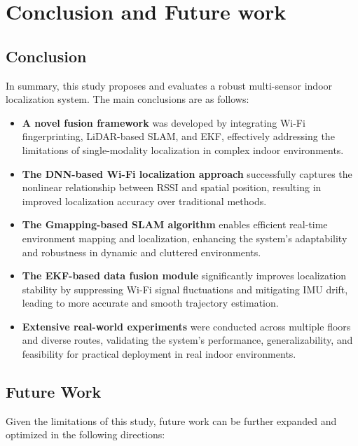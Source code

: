 \documentclass[12pt,a4paper]{article}
\numberwithin{equation}{section}
\begin{document}
\newpage
\section{Conclusion and Future work}
\subsection{Conclusion}
In summary, this study proposes and evaluates a robust multi-sensor indoor
localization system. The main conclusions are as follows:

\begin{itemize}
\item \textbf{A novel fusion framework} was developed by integrating Wi-Fi
  fingerprinting, LiDAR-based SLAM, and EKF, effectively addressing the
  limitations of single-modality localization in complex indoor environments.
  
\item \textbf{The DNN-based Wi-Fi localization approach} successfully captures
  the nonlinear relationship between RSSI and spatial position, resulting in
  improved localization accuracy over traditional methods.
  
\item \textbf{The Gmapping-based SLAM algorithm} enables efficient real-time
  environment mapping and localization, enhancing the system's adaptability and
  robustness in dynamic and cluttered environments.
  
\item \textbf{The EKF-based data fusion module} significantly improves
  localization stability by suppressing Wi-Fi signal fluctuations and mitigating
  IMU drift, leading to more accurate and smooth trajectory estimation.
  
\item \textbf{Extensive real-world experiments} were conducted across multiple
  floors and diverse routes, validating the system’s performance,
  generalizability, and feasibility for practical deployment in real indoor
  environments.
\end{itemize}

\subsection{Future Work}
Given the limitations of this study, future work can be further expanded and
optimized in the following directions:
\end{document}
